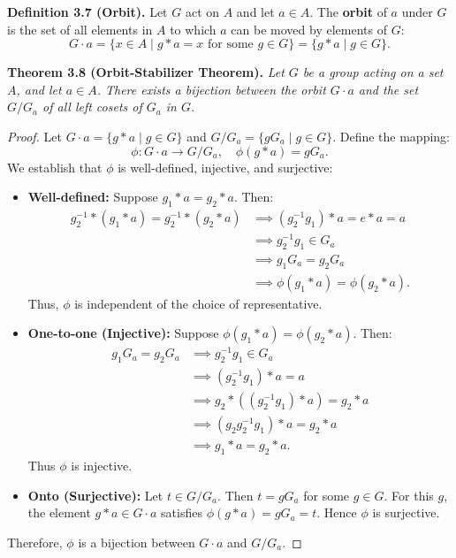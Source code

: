 \documentclass[11pt,a4paper]{article}
\begin{document}
\begin{defbox}
\textbf{Definition 3.7 (Orbit).} Let $G$ act on $A$ and let $a \in A$. The \textbf{orbit} of $a$ under $G$ is the set of all elements in $A$ to which $a$ can be moved by elements of $G$:
\[
G \cdot a = \{x \in A \mid g * a = x \text{ for some } g \in G\} = \{g * a \mid g \in G\}.
\]
\end{defbox}

\begin{thmbox}
\textbf{Theorem 3.8 (Orbit-Stabilizer Theorem).} \textit{Let $G$ be a group acting on a set $A$, and let $a \in A$. There exists a bijection between the orbit $G \cdot a$ and the set $G/G_a$ of all left cosets of $G_a$ in $G$.}
\end{thmbox}

\begin{proof}
Let $G \cdot a = \{g * a \mid g \in G\}$ and $G/G_a = \{g G_a \mid g \in G\}$. Define the mapping:
\[
\phi : G \cdot a \longrightarrow G/G_a, \quad \phi(g * a) = g G_a.
\]
We establish that $\phi$ is well-defined, injective, and surjective:
\begin{itemize}
    \item \textbf{Well-defined:} Suppose $g_1 * a = g_2 * a$. Then:
    \begin{align*}
        g_2^{-1} * (g_1 * a) = g_2^{-1} * (g_2 * a) &\implies (g_2^{-1} g_1) * a = e * a = a \\
        &\implies g_2^{-1} g_1 \in G_a \\
        &\implies g_1 G_a = g_2 G_a \\
        &\implies \phi(g_1 * a) = \phi(g_2 * a).
    \end{align*}
    Thus, $\phi$ is independent of the choice of representative.
    
    \item \textbf{One-to-one (Injective):} Suppose $\phi(g_1 * a) = \phi(g_2 * a)$. Then:
    \begin{align*}
        g_1 G_a = g_2 G_a &\implies g_2^{-1} g_1 \in G_a \\
        &\implies (g_2^{-1} g_1) * a = a \\
        &\implies g_2 * ((g_2^{-1} g_1) * a) = g_2 * a \\
        &\implies (g_2 g_2^{-1} g_1) * a = g_2 * a \\
        &\implies g_1 * a = g_2 * a.
    \end{align*}
    Thus $\phi$ is injective.
    
    \item \textbf{Onto (Surjective):} Let $t \in G/G_a$. Then $t = g G_a$ for some $g \in G$. For this $g$, the element $g * a \in G \cdot a$ satisfies $\phi(g * a) = g G_a = t$. Hence $\phi$ is surjective.
\end{itemize}
Therefore, $\phi$ is a bijection between $G \cdot a$ and $G/G_a$.
\end{proof}
\end{document}
